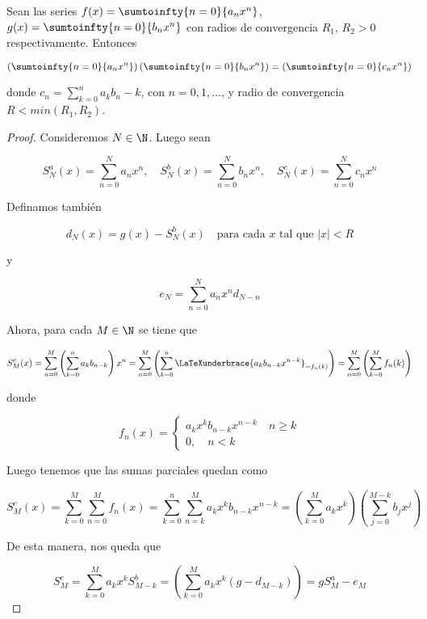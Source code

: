 \begin{teo}
    Sean las series $f(x) = \sumtoinfty{n=0}{a_nx^n}$, $g(x) = \sumtoinfty{n=0}{b_nx^n}$ con radios de convergencia $R_1$, $R_2 > 0$ respectivamente. Entonces
    
    \[
    \left(\sumtoinfty{n=0}{a_nx^n}\right)\left(\sumtoinfty{n=0}{b_nx^n}\right) = \left(\sumtoinfty{n=0}{c_nx^n}\right)
    \]
    
    \noindent donde $c_n = \sum_{k=0}^n a_kb_n-k$, con $n = 0,1,\dots$, y radio de convergencia $R < min(R_1,R_2)$.
\end{teo}

\begin{proof}
    Consideremos $N \in \N$. Luego sean
    
    \[
    S_N^a(x) = \sum_{n=0}^N a_nx^n, \quad S_N^b(x) = \sum_{n=0}^N b_nx^n, \quad S_N^c(x) = \sum_{n=0}^N c_nx^n
    \]
    
    Definamos también
    
    \[
    d_N(x) = g(x) - S_N^b(x) \quad \text{para cada $x$ tal que $|x|<R$}
    \]
    
    \noindent y 
    
    \[
    e_N = \sum_{n=0}^{N}a_nx^nd_{N-n}
    \]
    
    Ahora, para cada $M \in \N$ se tiene que
    
    \[
    S_M^c(x) = \sum_{n=0}^M \left(\sum_{k=0}^na_kb_{n-k}\right)x^n = \sum_{n=0}^M \left(\sum_{k=0}^n \LaTeXunderbrace{a_kb_{n-k}x^{n-k}}_{=f_n(k)} \right) = \sum_{n=0}^M \left(\sum_{k=0}^M f_n(k)\right)
    \]
    
    \noindent donde
    
    \[
    f_n(x) = \begin{cases}
                 a_kx^kb_{n-k}x^{n-k} \quad n \geq k \\
                 0, \quad n < k
             \end{cases}
    \]
    
    Luego tenemos que las sumas parciales quedan como
    
    \[
    S_M^c(x) = \sum_{k=0}^M \sum_{n=0}^M f_n(x) = \sum_{k=0}^n \sum_{n=k}^M a_kx^kb_{n-k}x^{n-k} = \left( \sum_{k=0}^M a_kx^k \right)\left(\sum_{j=0}^{M-k} b_jx^j\right)
    \]
    
    De esta manera, nos queda que
    
    \[
    S_M^c = \sum_{k=0}^M a_kx^kS_{M-k}^b = \left(\sum_{k=0}^M a_kx^k (g-d_{M-k})\right) = gS_M^a - e_M
    \]
    

\end{proof}
